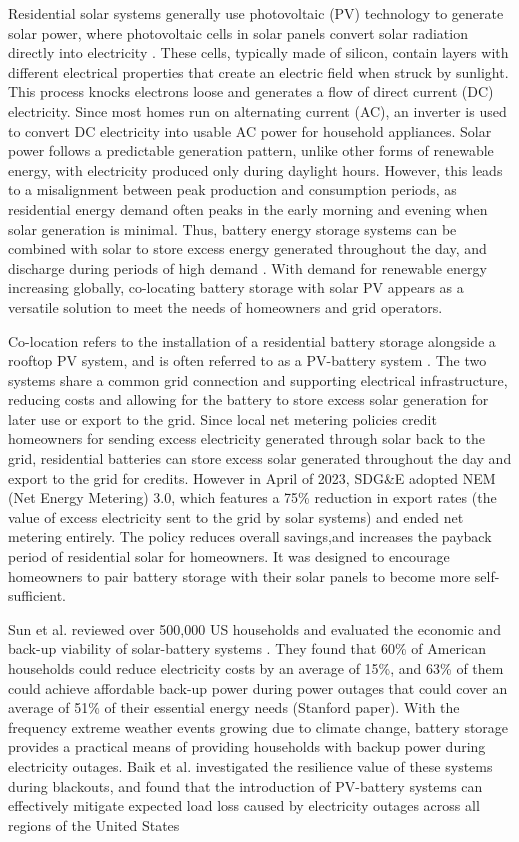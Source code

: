 \documentclass[14pt, final,numbered]{ifacconf}
\begin{document}
Residential solar systems generally use photovoltaic (PV) technology to generate solar power, where photovoltaic cells in solar panels convert solar radiation directly into electricity \cite{bagalini2019solar}. These cells, typically made of silicon, contain layers with different electrical properties that create an electric field when struck by sunlight. This process knocks electrons loose and generates a flow of direct current (DC) electricity. Since most homes run on alternating current (AC), an inverter is used to convert DC electricity into usable AC power for household appliances. Solar power follows a predictable generation pattern, unlike other forms of renewable energy, with electricity produced only during daylight hours. However, this leads to a misalignment between peak production and consumption periods, as residential energy demand often peaks in the early morning and evening when solar generation is minimal. Thus, battery energy storage systems can be combined with solar to store excess energy generated throughout the day, and discharge during periods of high demand \cite{scanu2024solar}. With demand for renewable energy increasing globally, co-locating battery storage with solar PV appears as a versatile solution to meet the needs of homeowners and grid operators. 

Co-location refers to the installation of a residential battery storage alongside a rooftop PV system, and is often referred to as a PV-battery system \cite{scanu2024solar}. The two systems share a common grid connection and supporting electrical infrastructure, reducing costs and allowing for the battery to store excess solar generation for later use or export to the grid. Since local net metering policies credit homeowners for sending excess electricity generated through solar back to the grid, residential batteries can store excess solar generated throughout the day and export to the grid for credits. However in April of 2023, SDG\&E adopted NEM (Net Energy Metering) 3.0, which features a 75\% reduction in export rates (the value of excess electricity sent to the grid by solar systems) and ended net metering entirely. The policy reduces overall savings,and increases the payback period of residential solar for homeowners. It was designed to encourage homeowners to pair battery storage with their solar panels to become more self-sufficient. 

Sun et al. reviewed over 500,000 US households  and evaluated the economic and back-up viability of solar-battery systems \cite{sun2025solar}. They found that 60\% of American households could reduce electricity costs by an average of 15\%, and 63\% of them could achieve affordable back-up power during power outages that could cover an average of 51\% of their essential energy needs (Stanford paper). With the frequency extreme weather events growing due to climate change, battery storage provides a practical means of providing households with backup power during electricity outages. Baik et al. investigated the resilience value of these systems during blackouts, and found that the introduction of PV-battery systems can effectively mitigate expected load loss caused by electricity outages across all regions of the United States \cite{baik2024resilience} 
\end{document}
